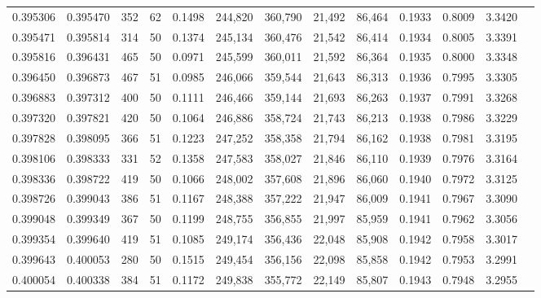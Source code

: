 \begin{tabular}{rrrrrrrrrrrrr}
0.395306 & 0.395470 &   352 &  62 &                                     0.1498 & 244,820 & 360,790 &  21,492 &  86,464 & 0.1933 & 0.8009 & 3.3420 \\
0.395471 & 0.395814 &   314 &  50 &                                     0.1374 & 245,134 & 360,476 &  21,542 &  86,414 & 0.1934 & 0.8005 & 3.3391 \\
0.395816 & 0.396431 &   465 &  50 &                                     0.0971 & 245,599 & 360,011 &  21,592 &  86,364 & 0.1935 & 0.8000 & 3.3348 \\
0.396450 & 0.396873 &   467 &  51 &                                     0.0985 & 246,066 & 359,544 &  21,643 &  86,313 & 0.1936 & 0.7995 & 3.3305 \\
0.396883 & 0.397312 &   400 &  50 &                                     0.1111 & 246,466 & 359,144 &  21,693 &  86,263 & 0.1937 & 0.7991 & 3.3268 \\
0.397320 & 0.397821 &   420 &  50 &                                     0.1064 & 246,886 & 358,724 &  21,743 &  86,213 & 0.1938 & 0.7986 & 3.3229 \\
0.397828 & 0.398095 &   366 &  51 &                                     0.1223 & 247,252 & 358,358 &  21,794 &  86,162 & 0.1938 & 0.7981 & 3.3195 \\
0.398106 & 0.398333 &   331 &  52 &                                     0.1358 & 247,583 & 358,027 &  21,846 &  86,110 & 0.1939 & 0.7976 & 3.3164 \\
0.398336 & 0.398722 &   419 &  50 &                                     0.1066 & 248,002 & 357,608 &  21,896 &  86,060 & 0.1940 & 0.7972 & 3.3125 \\
0.398726 & 0.399043 &   386 &  51 &                                     0.1167 & 248,388 & 357,222 &  21,947 &  86,009 & 0.1941 & 0.7967 & 3.3090 \\
0.399048 & 0.399349 &   367 &  50 &                                     0.1199 & 248,755 & 356,855 &  21,997 &  85,959 & 0.1941 & 0.7962 & 3.3056 \\
0.399354 & 0.399640 &   419 &  51 &                                     0.1085 & 249,174 & 356,436 &  22,048 &  85,908 & 0.1942 & 0.7958 & 3.3017 \\
0.399643 & 0.400053 &   280 &  50 &                                     0.1515 & 249,454 & 356,156 &  22,098 &  85,858 & 0.1942 & 0.7953 & 3.2991 \\
0.400054 & 0.400338 &   384 &  51 &                                     0.1172 & 249,838 & 355,772 &  22,149 &  85,807 & 0.1943 & 0.7948 & 3.2955 \\

\end{tabular}
